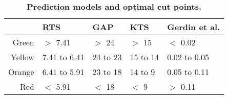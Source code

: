 \begin{table}[!ht]
\centering
\caption{\bf Prediction models and optimal cut points.} 
\label{table:cut_points}
\begin{adjustbox}{max width = \linewidth} 
\begin{tabular} 
{rllll}
  \toprule
 & RTS & GAP & KTS & Gerdin et al. \\ 
  \midrule
Green & $>$ 7.41 & $>$ 24 & $>$ 15 & $<$ 0.02 \\ 
  Yellow & 7.41 to 6.41 & 24 to 23 & 15 to 14 & 0.02 to 0.05 \\ 
  Orange & 6.41 to 5.91 & 23 to 18 & 14 to 9 & 0.05 to 0.11 \\ 
  Red & $<$ 5.91 & $<$ 18 & $<$ 9 & $>$ 0.11 \\ 
   \bottomrule
\end{tabular} 
\end{adjustbox}
\end{table}

